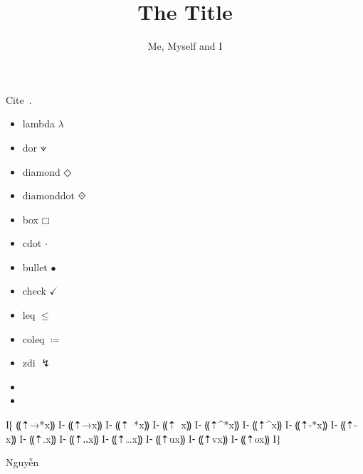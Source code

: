 \documentclass{article}
\title{The Title}
\author{Me, Myself and I}
\begin{document}
\maketitle

Cite~\citep{darais-icfp17}.

\begin{itemize}
   \item lambda $λ$ 
   \item dor $⟇$
   \item diamond $◇$
   \item diamonddot $⟐$
   \item box $□$
   \item cdot $⋅$
   \item bullet $•$
   \item check $✓$
   \item leq $≤$
   \item coleq $≔ $
   \item zdi $↯$
\end{itemize}

\begin{itemize}
  \item \lipsum[1-2]
  \item \lipsum[2-4]
\end{itemize}

I⁅ ⸨⇡→*{x}⸩
I⁃ ⸨⇡→{x}⸩
I⁃ ⸨⇡~*{x}⸩
I⁃ ⸨⇡~{x}⸩
I⁃ ⸨⇡^*{x}⸩
I⁃ ⸨⇡^{x}⸩
I⁃ ⸨⇡-*{x}⸩
I⁃ ⸨⇡-{x}⸩
I⁃ ⸨⇡.{x}⸩
I⁃ ⸨⇡‥{x}⸩
I⁃ ⸨⇡…{x}⸩
I⁃ ⸨⇡u{x}⸩
I⁃ ⸨⇡v{x}⸩
I⁃ ⸨⇡o{x}⸩
I⁆

Nguyễn



\end{document}

